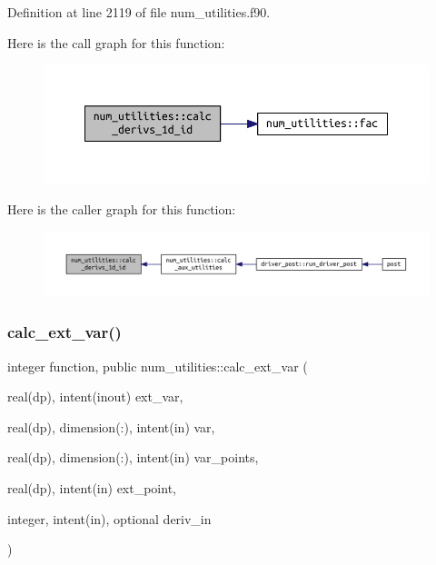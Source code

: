 Definition at line 2119 of file num\+\_\+utilities.\+f90.

Here is the call graph for this function\+:\nopagebreak
\begin{figure}[H]
\begin{center}
\leavevmode
\includegraphics[width=350pt]{namespacenum__utilities_af2e9ffd7ce2f9391bf8b6f1c344fabca_cgraph}
\end{center}
\end{figure}
Here is the caller graph for this function\+:\nopagebreak
\begin{figure}[H]
\begin{center}
\leavevmode
\includegraphics[width=350pt]{namespacenum__utilities_af2e9ffd7ce2f9391bf8b6f1c344fabca_icgraph}
\end{center}
\end{figure}
\mbox{\label{namespacenum__utilities_a2d5d9c66db19fb6edeeb50db6182397f}} 
\subsubsection{\texorpdfstring{calc\+\_\+ext\+\_\+var()}{calc\_ext\_var()}}
{\footnotesize\ttfamily integer function, public num\+\_\+utilities\+::calc\+\_\+ext\+\_\+var (\begin{DoxyParamCaption}\item[{real(dp), intent(inout)}]{ext\+\_\+var,  }\item[{real(dp), dimension(\+:), intent(in)}]{var,  }\item[{real(dp), dimension(\+:), intent(in)}]{var\+\_\+points,  }\item[{real(dp), intent(in)}]{ext\+\_\+point,  }\item[{integer, intent(in), optional}]{deriv\+\_\+in }\end{DoxyParamCaption})}



